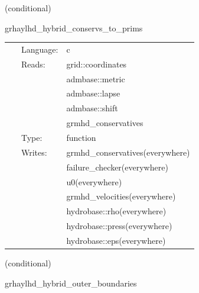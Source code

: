 \documentclass{article}
\begin{document}
\vspace{5mm}

   (conditional) 

\hspace{5mm} grhaylhd\_hybrid\_conservs\_to\_prims 

\hspace{5mm}{\it hybrid version of grhaylhd\_conservs\_to\_prims } 


\hspace{5mm}

 \begin{tabular*}{160mm}{cll} 
~ & Language:  & c \\ 
~ & Reads:  & grid::coordinates \\ 
~& ~ &admbase::metric\\ 
~& ~ &admbase::lapse\\ 
~& ~ &admbase::shift\\ 
~& ~ &grmhd\_conservatives\\ 
~ & Type:  & function \\ 
~ & Writes:  & grmhd\_conservatives(everywhere) \\ 
~& ~ &failure\_checker(everywhere)\\ 
~& ~ &u0(everywhere)\\ 
~& ~ &grmhd\_velocities(everywhere)\\ 
~& ~ &hydrobase::rho(everywhere)\\ 
~& ~ &hydrobase::press(everywhere)\\ 
~& ~ &hydrobase::eps(everywhere)\\ 
\end{tabular*} 


\vspace{5mm}

   (conditional) 

\hspace{5mm} grhaylhd\_hybrid\_outer\_boundaries 

\hspace{5mm}{\it hybrid version of grhaylhd\_outer\_boundaries } 


\hspace{5mm}
\end{document}
